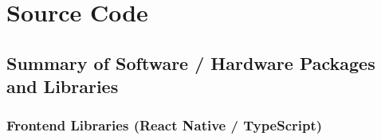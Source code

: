 \documentclass[12pt,a4paper]{report}
\begin{document}
\chapter{Source Code}

\section{Summary of Software / Hardware Packages and Libraries}

\subsection{Frontend Libraries (React Native / TypeScript)}
\end{document}
